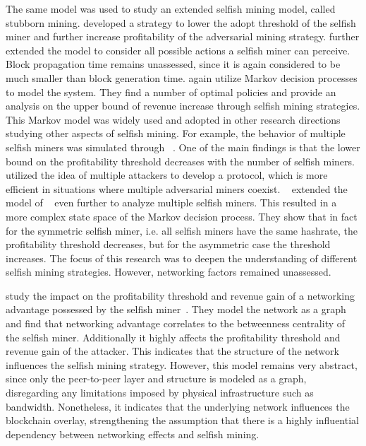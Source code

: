 The same model was used to study an extended selfish mining model, called stubborn mining.  developed a strategy to lower the adopt threshold of the selfish miner and further increase profitability of the adversarial mining strategy.
\citeauthor{optimal_sm} further extended the model to consider all possible actions a selfish miner can perceive. Block propagation time remains unassessed, since it is again considered to be much smaller than block generation time.  \citeauthor{optimal_sm} again utilize Markov decision processes to model the system. They find a number of optimal policies and provide an analysis on the upper bound of revenue increase through selfish mining strategies.
This Markov model was widely used and adopted in other research directions studying other aspects of selfish mining. For example, the behavior of multiple selfish miners was simulated through \citeauthor{multi_sm}~\cite{multi_sm}. One of the main findings is that the lower bound on the profitability threshold decreases with the number of selfish miners.  utilized the idea of multiple attackers to develop a protocol,   which is more efficient in situations where multiple adversarial miners coexist. 
\citeauthor{deepDiveSM}~\cite{deepDiveSM} extended the model of \citeauthor{optimal_sm}~\cite{optimal_sm} even further to analyze multiple selfish miners. This resulted in a more complex state space of the Markov decision process. They show that in fact for the symmetric selfish miner, i.e. all selfish miners have the same hashrate, the profitability threshold decreases, but for the asymmetric case the threshold increases. The focus of this research was to deepen the understanding of different selfish mining strategies. However, networking factors remained unassessed.

\citeauthor{xiao_modeling} study the impact on the profitability threshold and revenue gain of a networking advantage possessed by the selfish miner~\cite{xiao_modeling}. They model the network as a graph and find that networking advantage correlates to the betweenness centrality of the selfish miner. Additionally it highly affects the profitability threshold and revenue gain of the attacker. This indicates that the structure of the network influences the selfish mining strategy. However, this model remains very abstract, since only the peer-to-peer layer and structure is modeled as a graph, disregarding any limitations imposed by physical infrastructure such as bandwidth. Nonetheless, it indicates that the underlying network influences the blockchain overlay, strengthening the assumption that there is a highly influential dependency between networking effects and selfish mining.

